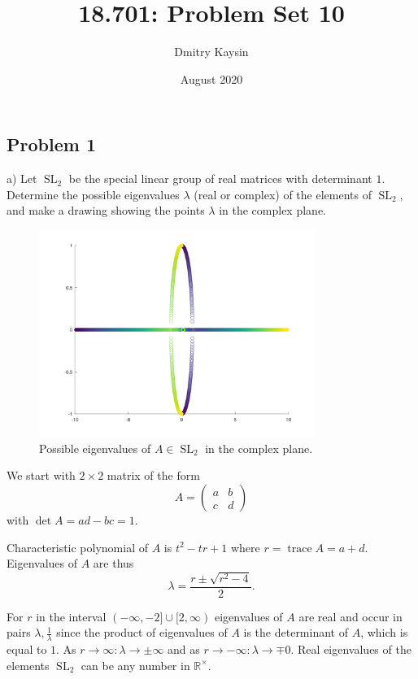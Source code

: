 \documentclass{article}
\title{18.701: Problem Set 10}
\author{Dmitry Kaysin}
\date{August 2020}
\theoremstyle{definition}
\newcommand{\trace}{\operatorname{trace}}
\newcommand{\R}{\mathbb{R}}
\newcommand{\SL}{\operatorname{SL}}
\begin{document}
\maketitle 


\subsection*{Problem 1}

\begin{tcolorbox}
a) Let $\SL_2$ be the special linear group of real matrices with determinant $1$.
Determine the possible eigenvalues $\lambda$ (real or complex) of the elements of $\SL_2$, and make a drawing showing the points $\lambda$ in the complex plane.
\end{tcolorbox}

\begin{figure}[h]
    \caption{Possible eigenvalues of $A \in \SL_2$ in the complex plane.}
    \centering
    \includegraphics[width=0.8\textwidth]{ps10p1}
\end{figure}

We start with $2 \times 2$ matrix of the form
\[
    A =
    \begin{pmatrix}
        a & b \\
        c & d
    \end{pmatrix}
\]
with $\det A = ad - bc = 1$.

Characteristic polynomial of $A$ is $t^2 - tr + 1$ where $r = \trace A = a+d$.
Eigenvalues of $A$ are thus
\[
    \lambda = \frac{r \pm \sqrt{r^2-4}}{2}.
\]

For $r$ in the interval $(-\infty, -2] \cup [2, \infty)$ eigenvalues of $A$ are real and occur in pairs $\lambda, \frac{1}{\lambda}$ since the product of eigenvalues of $A$ is the determinant of $A$, which is equal to $1$.
As $r \to \infty : \lambda \to \pm \infty$ and
as $r \to -\infty : \lambda \to \mp 0$.
Real eigenvalues of the elements $\SL_2$ can be any number in $\R^\times$.
\end{document}
